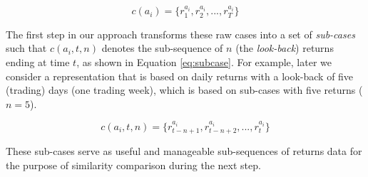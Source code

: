 \documentclass[runningheads]{llncs}
\begin{document}
\begin{equation}
    \label{eq:rawcase}
    c(a_i) = \{r_{1}^{a_i}, r_{2}^{a_i}, ..., r_{T}^{a_i}\}
\end{equation}

The first step in our approach transforms these raw cases into a set of \emph{sub-cases} such that $c(a_{i}, t, n)$ denotes the sub-sequence of $n$ (the \emph{look-back}) returns ending at time $t$, as shown in Equation \ref{eq:subcase}. For example, later we consider a representation that is based on daily returns with a look-back of five (trading) days (one trading week), which is based on sub-cases with five returns ($n=5$).

\begin{equation}\label{eq:subcase}
    c(a_i,t, n)=\{r_{t-n+1}^{a_i}, r_{t-n+2}^{a_i}, ..., r_{t}^{a_i}\}
\end{equation}

These sub-cases serve as useful and manageable sub-sequences of returns data for the purpose of similarity comparison during the next step.





\end{document}
